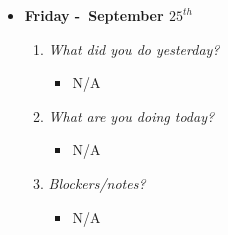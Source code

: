 \begin{itemize}
  \item[] \textbf{\large Friday -\ September \(25^{th}\)}
  \begin{enumerate}
    \item \textsl{What did you do yesterday?}
    \begin{itemize}
      \item N/A
    \end{itemize}
    \item \textsl{What are you doing today?}
    \begin{itemize}
      \item N/A
    \end{itemize}
    \item \textsl{Blockers/notes?}
    \begin{itemize}
      \item N/A
    \end{itemize}
  \end{enumerate}
\end{itemize}
